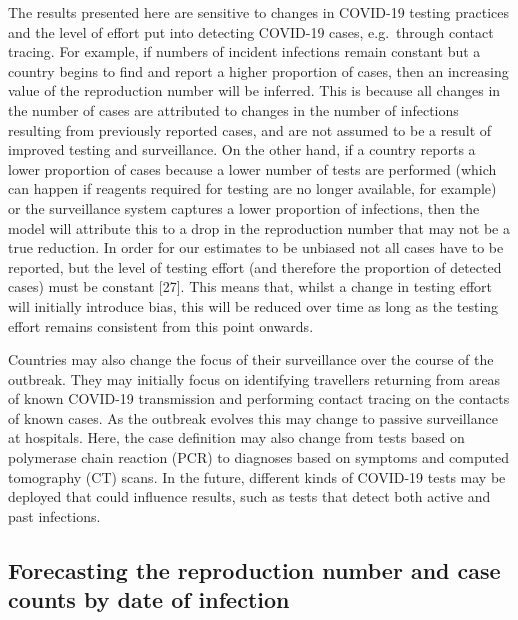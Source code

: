 \documentclass[
]{article}
\begin{document}
The results presented here are sensitive to changes in COVID-19 testing
practices and the level of effort put into detecting COVID-19 cases,
e.g.~through contact tracing. For example, if numbers of incident
infections remain constant but a country begins to find and report a
higher proportion of cases, then an increasing value of the reproduction
number will be inferred. This is because all changes in the number of
cases are attributed to changes in the number of infections resulting
from previously reported cases, and are not assumed to be a result of
improved testing and surveillance. On the other hand, if a country
reports a lower proportion of cases because a lower number of tests are
performed (which can happen if reagents required for testing are no
longer available, for example) or the surveillance system captures a
lower proportion of infections, then the model will attribute this to a
drop in the reproduction number that may not be a true reduction. In
order for our estimates to be unbiased not all cases have to be
reported, but the level of testing effort (and therefore the proportion
of detected cases) must be constant {[}27{]}. This means that, whilst a
change in testing effort will initially introduce bias, this will be
reduced over time as long as the testing effort remains consistent from
this point onwards.

Countries may also change the focus of their surveillance over the
course of the outbreak. They may initially focus on identifying
travellers returning from areas of known COVID-19 transmission and
performing contact tracing on the contacts of known cases. As the
outbreak evolves this may change to passive surveillance at hospitals.
Here, the case definition may also change from tests based on polymerase
chain reaction (PCR) to diagnoses based on symptoms and computed
tomography (CT) scans. In the future, different kinds of COVID-19 tests
may be deployed that could influence results, such as tests that detect
both active and past infections.

\hypertarget{forecasting-the-reproduction-number-and-case-counts-by-date-of-infection}{%
\subsection{Forecasting the reproduction number and case counts by date
of
infection}\label{forecasting-the-reproduction-number-and-case-counts-by-date-of-infection}}
\end{document}
